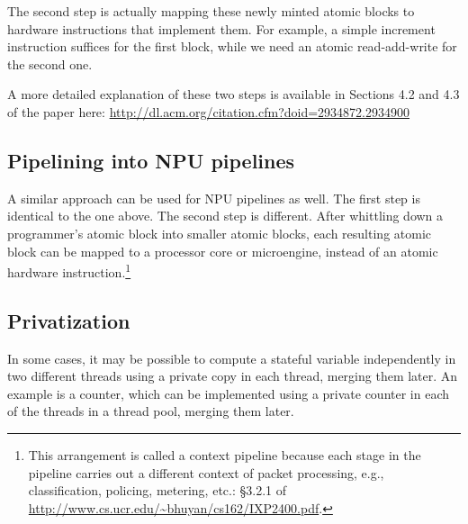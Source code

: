The second step is actually mapping these newly minted atomic blocks to
hardware instructions that implement them. For example, a simple increment
instruction suffices for the first block, while we need an atomic
read-add-write for the second one.

A more detailed explanation of these two steps is available in Sections 4.2 and
4.3 of the paper here:
\url{http://dl.acm.org/citation.cfm?doid=2934872.2934900}

\subsection{Pipelining into NPU pipelines}
A similar approach can be used for NPU pipelines as well. The first step is
identical to the one above. The second step is different. After whittling down
a programmer's atomic block into smaller atomic blocks, each resulting atomic
block can be mapped to a processor core or microengine, instead of an atomic
hardware instruction.\footnote{This arrangement is
called a context pipeline because each stage in the pipeline carries out a
different context of packet processing, e.g., classification, policing,
metering, etc.: \S3.2.1 of
\url{http://www.cs.ucr.edu/~bhuyan/cs162/IXP2400.pdf}.}

\subsection{Privatization}

In some cases, it may be possible to compute a stateful variable independently
in two different threads using a private copy in each thread, merging them
later. An example is a counter, which can be implemented using a private
counter in each of the threads in a thread pool, merging them later.
